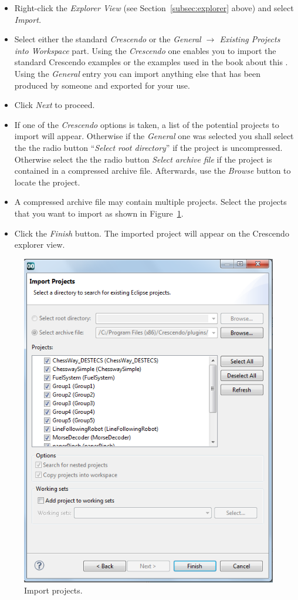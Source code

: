 \documentclass{crescendorepchap}
\begin{document}
\begin{itemize}
\item
  Right-click the \emph{Explorer View} (see Section~\ref{subsec:explorer} above)  and
  select \emph{Import.}
\item
  Select either the standard \emph{Crescendo} or the \emph{General $\rightarrow$ Existing Projects into
  Workspace} part. Using the \emph{Crescendo} one enables you to import the standard Crescendo examples or the examples used in the book about this \cite{Fitzgerald&13a}. Using the \emph{General} entry you can import anything else that has been produced by someone and exported for your use.
\item
  Click \emph{Next} to proceed.
\item
  If one of the \emph{Crescendo} options is taken, a list of the potential projects to import will appear. Otherwise if the  \emph{General} one was selected you shall select the the radio button ``\emph{Select root directory}'' if the project
  is uncompressed. Otherwise select the the radio button \emph{Select archive
  file} if the project is contained in a compressed archive file. Afterwards, use
  the \emph{Browse} button to locate the project.
\item
  A compressed archive file may contain multiple projects. Select
  the projects that you want to import as shown in Figure~\ref{fig:importproject}.
\item
  Click the \emph{Finish} button. The imported project will appear on
  the Crescendo explorer view.
\end{itemize}

\begin{figure}[htbp]
\centering
\includegraphics[width=.6\textwidth]{images/DestecsImportProject.png}
\caption{Import projects.\label{fig:importproject}}
\end{figure}
\end{document}
